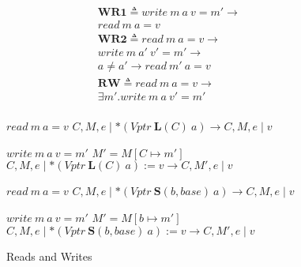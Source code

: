 \documentclass{article}
\begin{document}
\begin{figure}

  \begin{minipage}[t]{0.3\textwidth}
    \[\begin{aligned}
    \mathbf{WR1} \triangleq
    \mathit{write} ~ m ~ a ~ v = m' \rightarrow & \\
    \mathit{read} ~ m ~ a = v & \\[0.75em]
    \mathbf{WR2} \triangleq \mathit{read} ~ m ~ a = v \rightarrow & \\
    \mathit{write} ~ m ~ a' ~ v' = m' \rightarrow & \\
    a \not = a' \rightarrow \mathit{read} ~ m' ~ a = v & \\[0.75em]
    \mathbf{RW} \triangleq \mathit{read} ~ m ~ a = v \rightarrow & \\
    \exists m' . \mathit{write} ~ m ~ a ~ v' = m' & \\
    \end{aligned}\]
  \end{minipage}
  \begin{minipage}[t]{0.69\textwidth}
                {\(\mathit{read} ~ m ~ a = v\)}
                {\(C,M,e \mid *(\mathit{Vptr} ~ \mathbf{L}(C) ~ a)
                  \longrightarrow C,M,e \mid v\)}

                  {\(\mathit{write} ~ m ~ a ~ v = m'\)}
                  {\(M' = M[C \mapsto m']\)}
                  {\(C,M,e \mid *(\mathit{Vptr} ~ \mathbf{L}(C) ~ a) := v
                    \longrightarrow C,M',e \mid v\)}

                {\(\mathit{read} ~ m ~ a = v\)}
                {\(C,M,e \mid *(\mathit{Vptr} ~ \mathbf{S}(b, \mathit{base}) ~ a)
                  \longrightarrow C,M,e \mid v\)}

                  {\(\mathit{write} ~ m ~ a ~ v = m'\)}
                  {\(M' = M[b \mapsto m']\)}
                  {\(C,M,e \mid *(\mathit{Vptr} ~ \mathbf{S}(b, \mathit{base}) ~ a) := v
                    \longrightarrow C,M',e \mid v\)}
  \end{minipage}

  \caption{Reads and Writes}
  \label{subfig:rwstep}
\end{figure}
\end{document}
